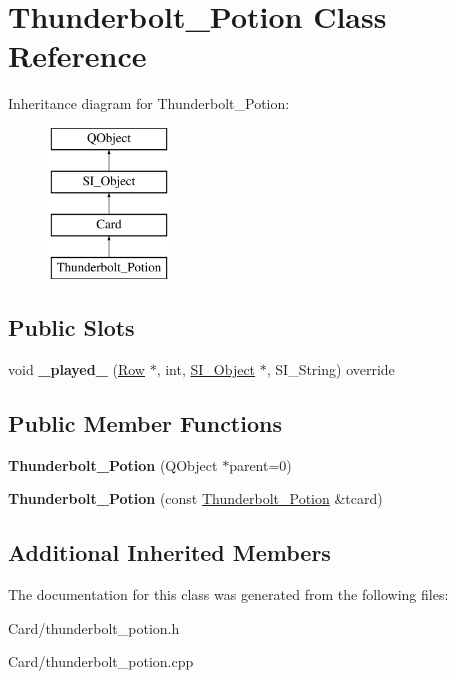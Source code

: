 \hypertarget{class_thunderbolt___potion}{}\section{Thunderbolt\+\_\+\+Potion Class Reference}
\label{class_thunderbolt___potion}
Inheritance diagram for Thunderbolt\+\_\+\+Potion\+:\begin{figure}[H]
\begin{center}
\leavevmode
\includegraphics[height=4.000000cm]{class_thunderbolt___potion}
\end{center}
\end{figure}
\subsection*{Public Slots}
\begin{DoxyCompactItemize}
\item 
\mbox{\label{class_thunderbolt___potion_a9465d6ee7ffd3ff1bbc4095e780bbce6}} 
void {\bfseries \+\_\+played\+\_\+} (\hyperlink{class_card_set}{Row} $\ast$, int, \hyperlink{class_s_i___object}{S\+I\+\_\+\+Object} $\ast$, S\+I\+\_\+\+String) override
\end{DoxyCompactItemize}
\subsection*{Public Member Functions}
\begin{DoxyCompactItemize}
\item 
\mbox{\label{class_thunderbolt___potion_a585626969c780e3ca4cb980d87e543e2}} 
{\bfseries Thunderbolt\+\_\+\+Potion} (Q\+Object $\ast$parent=0)
\item 
\mbox{\label{class_thunderbolt___potion_aabc17b5902f8bb915ad07353595efc69}} 
{\bfseries Thunderbolt\+\_\+\+Potion} (const \hyperlink{class_thunderbolt___potion}{Thunderbolt\+\_\+\+Potion} \&tcard)
\end{DoxyCompactItemize}
\subsection*{Additional Inherited Members}


The documentation for this class was generated from the following files\+:\begin{DoxyCompactItemize}
\item 
Card/thunderbolt\+\_\+potion.\+h\item 
Card/thunderbolt\+\_\+potion.\+cpp\end{DoxyCompactItemize}
